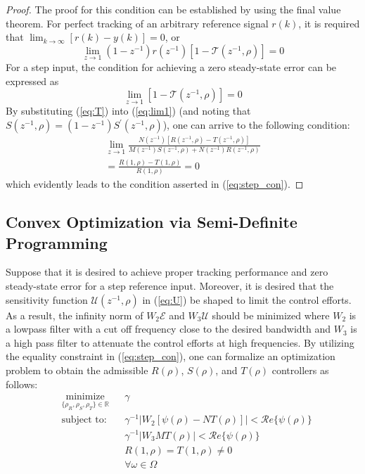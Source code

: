 \documentclass[a4paper, 10pt, conference]{ieeeconf}
\begin{document}
\begin{proof}
The proof for this condition can be established by using the final value theorem. For perfect tracking of an arbitrary reference signal $r(k)$, it is required that $\lim_{k \to \infty} [r(k)-y(k)] = 0$, or
\begin{equation}
\lim_{z \to 1}(1-z^{-1})r(z^{-1})[1-\mathcal{T}(z^{-1},\rho)] = 0
\end{equation}
For a step input, the condition for achieving a zero steady-state error can be expressed as
\begin{equation} \label{eq:lim1}
\lim_{z \to 1} [1-\mathcal{T}(z^{-1},\rho)] = 0 
\end{equation}
By substituting (\ref{eq:T}) into (\ref{eq:lim1}) (and noting that $S(z^{-1},\rho) = (1-z^{-1}) S^{\prime}(z^{-1},\rho)$), one can arrive to the following condition:
\begin{eqnarray} \label{eq:limf}
\lim_{z \to 1} \frac{N(z^{-1})[R(z^{-1},\rho) - T(z^{-1},\rho)]}{M(z^{-1})S(z^{-1},\rho) + N(z^{-1})R(z^{-1},\rho)} \nonumber\\
 = \frac{R(1,\rho) - T(1,\rho)}{R(1,\rho)} = 0
\end{eqnarray} 
which evidently leads to the  condition asserted in (\ref{eq:step_con}).
\end{proof}


\subsection{Convex Optimization via Semi-Definite Programming}
Suppose that it is desired to achieve proper tracking performance and zero steady-state error for a step reference input. Moreover, it is desired that the sensitivity function $\mathcal{U}(z^{-1},\rho)$ in (\ref{eq:U}) be shaped to limit the control efforts. As a result, the infinity norm of $W_2\mathcal{E}$ and $W_3\mathcal{U}$ should be minimized where $W_2$ is a lowpass filter with a cut off frequency close to the desired bandwidth and $W_3$ is a high pass filter to attenuate the control efforts at high frequencies. By utilizing the equality constraint in (\ref{eq:step_con}), one can formalize an optimization problem to obtain the admissible $R(\rho)$, $S(\rho)$, and $T(\rho)$ controllers as follows: 
\begin{equation} \label{eq:min2}
\begin{aligned}
& \underset{ \{\rho_R,\rho_S,\rho_T\} \in \mathbb{R}}{\text{minimize}}
& & \gamma  \\
& \text{subject to:} & & \gamma^{-1} |W_2[\psi(\rho) - NT(\rho)]|    < \mathcal{R}e\{\psi(\rho) \}  \\ 
& & & \gamma^{-1} |W_3MT(\rho)|   < \mathcal{R}e\{\psi(\rho) \} \\
& & & R(1,\rho) = T(1,\rho) \neq 0\\
& & & \forall \omega \in \Omega 
\end{aligned}
\end{equation}
\end{document}
